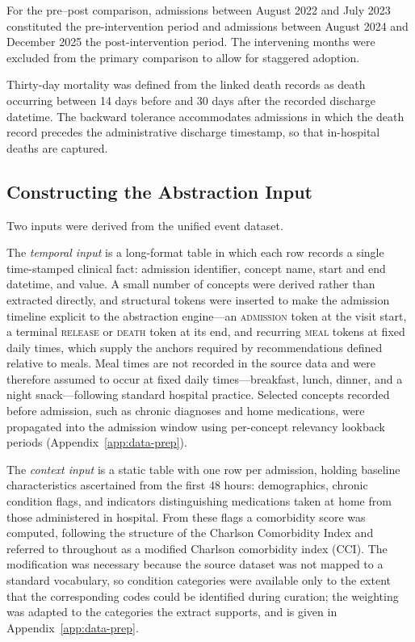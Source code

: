 For the pre--post comparison, admissions between August 2022 and July 2023
constituted the pre-intervention period and admissions between August 2024
and December 2025 the post-intervention period. The intervening months were
excluded from the primary comparison to allow for staggered adoption.

Thirty-day mortality was defined from the linked death records as death
occurring between 14 days before and 30 days after the recorded discharge
datetime. The backward tolerance accommodates admissions in which the death
record precedes the administrative discharge timestamp, so that in-hospital
deaths are captured.

\subsection{Constructing the Abstraction Input}

Two inputs were derived from the unified event dataset.

The \emph{temporal input} is a long-format table in which each row records a
single time-stamped clinical fact: admission identifier, concept name, start
and end datetime, and value. A small number of concepts were derived rather
than extracted directly, and structural tokens were inserted to make the
admission timeline explicit to the abstraction engine---an \textsc{admission}
token at the visit start, a terminal \textsc{release} or \textsc{death}
token at its end, and recurring \textsc{meal} tokens at fixed daily times,
which supply the anchors required by recommendations defined relative to
meals. Meal times are not recorded in the source data and were therefore
assumed to occur at fixed daily times---breakfast, lunch, dinner, and a
night snack---following standard hospital practice. Selected concepts
recorded before admission, such as chronic
diagnoses and home medications, were propagated into the admission window
using per-concept relevancy lookback periods
(Appendix~\ref{app:data-prep}).

The \emph{context input} is a static table with one row per admission,
holding baseline characteristics ascertained from the first 48 hours:
demographics, chronic condition flags, and indicators distinguishing
medications taken at home from those administered in hospital. From these
flags a comorbidity score was computed, following the structure of the
Charlson Comorbidity Index and referred to throughout as a modified Charlson
comorbidity index (CCI). The modification was necessary because the source
dataset was not mapped to a standard vocabulary, so condition categories
were available only to the extent that the corresponding codes could be
identified during curation; the weighting was adapted to the categories the
extract supports, and is given in Appendix~\ref{app:data-prep}.

